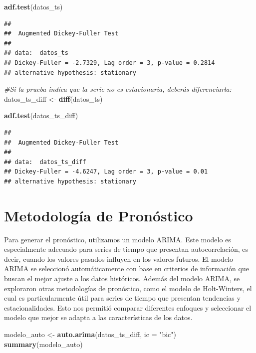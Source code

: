 \documentclass[
]{book}
\newenvironment{Shaded}{\begin{snugshade}}{\end{snugshade}}
\newcommand{\AttributeTok}[1]{\textcolor[rgb]{0.13,0.29,0.53}{#1}}
\newcommand{\CommentTok}[1]{\textcolor[rgb]{0.56,0.35,0.01}{\textit{#1}}}
\newcommand{\FunctionTok}[1]{\textcolor[rgb]{0.13,0.29,0.53}{\textbf{#1}}}
\newcommand{\NormalTok}[1]{#1}
\newcommand{\OtherTok}[1]{\textcolor[rgb]{0.56,0.35,0.01}{#1}}
\newcommand{\StringTok}[1]{\textcolor[rgb]{0.31,0.60,0.02}{#1}}
\begin{document}
\begin{Shaded}
\begin{Highlighting}[]
\FunctionTok{adf.test}\NormalTok{(datos\_ts)}
\end{Highlighting}
\end{Shaded}

\begin{verbatim}
## 
##  Augmented Dickey-Fuller Test
## 
## data:  datos_ts
## Dickey-Fuller = -2.7329, Lag order = 3, p-value = 0.2814
## alternative hypothesis: stationary
\end{verbatim}

\begin{Shaded}
\begin{Highlighting}[]
\CommentTok{\#Si la prueba indica que la serie no es estacionaria, deberás diferenciarla:}
\NormalTok{datos\_ts\_diff }\OtherTok{\textless{}{-}} \FunctionTok{diff}\NormalTok{(datos\_ts)}

\FunctionTok{adf.test}\NormalTok{(datos\_ts\_diff)}
\end{Highlighting}
\end{Shaded}

\begin{verbatim}
## 
##  Augmented Dickey-Fuller Test
## 
## data:  datos_ts_diff
## Dickey-Fuller = -4.6247, Lag order = 3, p-value = 0.01
## alternative hypothesis: stationary
\end{verbatim}

\section{\texorpdfstring{\textbf{Metodología de Pronóstico}}{Metodología de Pronóstico}}\label{metodologuxeda-de-pronuxf3stico}

Para generar el pronóstico, utilizamos un modelo ARIMA. Este modelo es especialmente adecuado para series de tiempo que presentan autocorrelación, es decir, cuando los valores pasados influyen en los valores futuros. El modelo ARIMA se seleccionó automáticamente con base en criterios de información que buscan el mejor ajuste a los datos históricos. Además del modelo ARIMA, se exploraron otras metodologías de pronóstico, como el modelo de Holt-Winters, el cual es particularmente útil para series de tiempo que presentan tendencias y estacionalidades. Esto nos permitió comparar diferentes enfoques y seleccionar el modelo que mejor se adapta a las características de los datos.

\begin{Shaded}
\begin{Highlighting}[]
\NormalTok{modelo\_auto }\OtherTok{\textless{}{-}} \FunctionTok{auto.arima}\NormalTok{(datos\_ts\_diff, }\AttributeTok{ic =} \StringTok{"bic"}\NormalTok{) }
\FunctionTok{summary}\NormalTok{(modelo\_auto)}
\end{Highlighting}
\end{Shaded}
\end{document}
